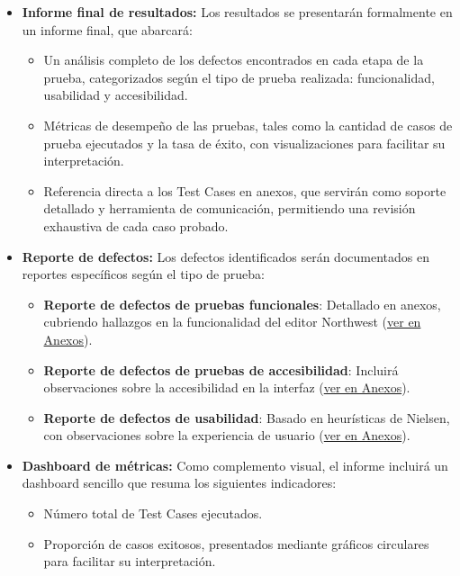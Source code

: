 \documentclass[stu, 12pt, letterpaper, donotrepeattitle, floatsintext, natbib]{apa7}
\begin{document}
\begin{itemize}
    \item \textbf{Informe final de resultados:} Los resultados se presentarán formalmente en un informe final, que abarcará:
    \begin{itemize}
        \item Un análisis completo de los defectos encontrados en cada etapa de la prueba, categorizados según el tipo de prueba realizada: funcionalidad, usabilidad y accesibilidad.
        \item Métricas de desempeño de las pruebas, tales como la cantidad de casos de prueba ejecutados y la tasa de éxito, con visualizaciones para facilitar su interpretación.
        \item Referencia directa a los Test Cases en anexos, que servirán como soporte detallado y herramienta de comunicación, permitiendo una revisión exhaustiva de cada caso probado.
    \end{itemize}

    \item \textbf{Reporte de defectos:} Los defectos identificados serán documentados en reportes específicos según el tipo de prueba:
    \begin{itemize}
        \item \textbf{Reporte de defectos de pruebas funcionales}: Detallado en anexos, cubriendo hallazgos en la funcionalidad del editor Northwest (\hyperref[tab:reporte_defectos]{ver en Anexos}).
        \item \textbf{Reporte de defectos de pruebas de accesibilidad}: Incluirá observaciones sobre la accesibilidad en la interfaz (\hyperref[tab:reporte_accesibilidad]{ver en Anexos}).
        \item \textbf{Reporte de defectos de usabilidad}: Basado en heurísticas de Nielsen, con observaciones sobre la experiencia de usuario (\hyperref[tab:reporte_usabilidad]{ver en Anexos}).
    \end{itemize}

    
    \item \textbf{Dashboard de métricas:} Como complemento visual, el informe incluirá un dashboard sencillo que resuma los siguientes indicadores:
    \begin{itemize}
        \item Número total de Test Cases ejecutados.
        \item Proporción de casos exitosos, presentados mediante gráficos circulares para facilitar su interpretación.
    \end{itemize}
\end{itemize}
\end{document}
